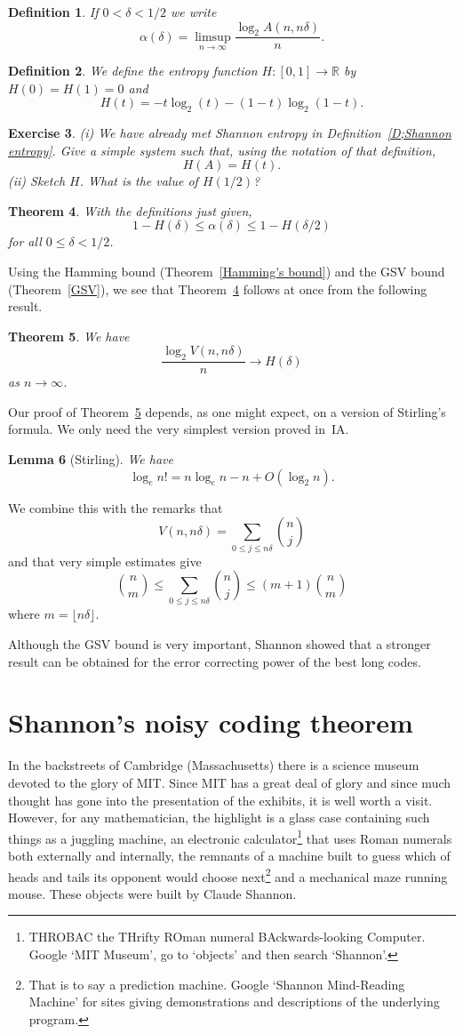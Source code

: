 \documentclass[12pt,a4paper]{article}
\theoremstyle{plain}
\newtheorem{theorem}{Theorem}[section]
\newtheorem{lemma}[theorem]{Lemma}
\newtheorem{definition}[theorem]{Definition}
\newtheorem{exercise}[theorem]{Exercise}
\theoremstyle{definition}
\begin{document}
\begin{definition} If $0<\delta<1/2$ we write
\[\alpha(\delta)=\limsup_{n\rightarrow\infty}
\frac{\log_{2} A(n,n\delta)}{n}.\]
\end{definition}
\begin{definition} We define the entropy
function $H:[0,1]\rightarrow{\mathbb R}$
by $H(0)=H(1)=0$ and
\[H(t)=-t\log_{2}(t)-(1-t)\log_{2}(1-t).\]
\end{definition}
\begin{exercise} (i) We have already met
Shannon entropy in Definition~\ref{D;Shannon entropy}.
Give a simple system such that, using the notation 
of that definition,
\[H(A)=H(t).\]
(ii) Sketch $H$. What is the value of $H(1/2)$?
\end{exercise}
\begin{theorem}\label{T;alpha}
With the definitions just given,
\[1-H(\delta)\leq\alpha(\delta)\leq 1-H(\delta/2)\]
for all $0\leq \delta<1/2$.
\end{theorem}
Using the Hamming bound (Theorem~\ref{Hamming's bound})
and the GSV bound (Theorem~\ref{GSV}), we see that
Theorem~\ref{T;alpha} follows at once from the
following result.
\begin{theorem}\label{log volume} We have
\[\frac{\log_{2}V(n,n\delta)}{n}
\rightarrow H(\delta)\]
as $n\rightarrow\infty$.
\end{theorem}
Our proof of Theorem~\ref{log volume} depends, as
one might expect, on a version of Stirling's formula.
We only need the very simplest version proved
in~IA.
\begin{lemma}[Stirling] We have
\[\log_{e} n!=n\log_{e}n-n+O(\log_{2}n).\]
\end{lemma}
We combine this with the remarks that
\[V(n,n\delta)=\sum_{0\leq j\leq n\delta}
\binom{n}{j}\]
and that very simple estimates give
\[\binom{n}{m}\leq \sum_{0\leq j\leq n\delta}
\binom{n}{j}
\leq (m+1)\binom{n}{m}\]
where $m=\lfloor n\delta\rfloor$.

Although the GSV bound is very important,
Shannon showed that
a stronger result can be obtained for the
error correcting power of the best long codes.
\section{Shannon's noisy coding theorem}
In the backstreets of Cambridge
(Massachusetts) there is a science museum devoted to
the glory of MIT. Since MIT has a great deal of glory
and since much thought has gone into the presentation
of the exhibits, it is well worth a visit. However,
for any mathematician, the highlight is a glass case
containing such things as a juggling machine,
an electronic calculator\footnote{THROBAC
the THrifty ROman numeral BAckwards-looking Computer.
Google `MIT Museum', go to `objects'  and then
search `Shannon'.}
that uses Roman numerals both externally and internally,
the remnants of a machine built to guess which
of heads and tails its opponent would choose 
next\footnote{That is to say a prediction machine.
Google `Shannon Mind-Reading Machine' for sites
giving demonstrations and descriptions of the underlying program.}
and a mechanical maze running mouse.
These objects were built by Claude Shannon.
\end{document}
